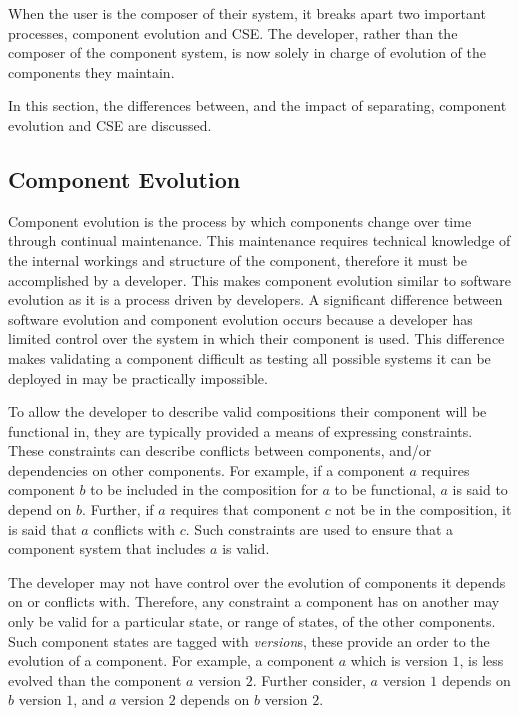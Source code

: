 When the user is the composer of their system, it breaks apart two important processes,
component evolution and CSE.
The developer, rather than the composer of the component system, is now solely in charge of evolution of the components they maintain. 

In this section, the differences between, and the impact of separating, component evolution and CSE are discussed.

\subsection{Component Evolution}
Component evolution is the process by which components change over time through continual maintenance.
This maintenance requires technical knowledge of the internal workings and structure of the component, therefore it must be accomplished by a developer.
This makes component evolution similar to software evolution as it is a process driven by developers.
A significant difference between software evolution and component evolution occurs because a developer has limited control over the system in which their component is used.
This difference makes validating a component difficult as testing all possible systems it can be deployed in may be practically impossible.

To allow the developer to describe valid compositions their component will be functional in, 
they are typically provided a means of expressing constraints.
These constraints can describe conflicts between components, and/or dependencies on other components.
For example, if a component $a$ requires component $b$ to be included in the composition for $a$ to be functional, $a$ is said to depend on $b$.
Further, if $a$ requires that component $c$ not be in the composition, it is said that $a$ conflicts with $c$.
Such constraints are used to ensure that a component system that includes $a$ is valid. 
 
The developer may not have control over the evolution of components it depends on or conflicts with.
Therefore, any constraint a component has on another may only be valid for a particular state, or range of states, of the other components.
Such component states are tagged with \textit{version}s, these provide an order to the evolution of a component.
For example, a component $a$ which is version $1$, is less evolved than the component $a$ version $2$.
Further consider, $a$ version $1$ depends on $b$ version $1$, and $a$ version $2$ depends on $b$ version $2$.

